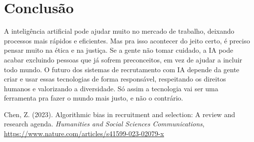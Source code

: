 \documentclass[english]{article}
\begin{document}
\section{Conclusão}
A inteligência artificial pode ajudar muito no mercado de trabalho, deixando processos mais rápidos e eficientes. Mas pra isso acontecer do jeito certo, é preciso pensar muito na ética e na justiça. Se a gente não tomar cuidado, a IA pode acabar excluindo pessoas que já sofrem preconceitos, em vez de ajudar a incluir todo mundo. O futuro dos sistemas de recrutamento com IA depende da gente criar e usar essas tecnologias de forma responsável, respeitando os direitos humanos e valorizando a diversidade. Só assim a tecnologia vai ser uma ferramenta pra fazer o mundo mais justo, e não o contrário.

\begin{thebibliography}{1}
 Chen, Z. (2023). Algorithmic bias in recruitment and selection: A review and research agenda. \textit{Humanities and Social Sciences Communications}, \href{https://www.nature.com/articles/s41599-023-02079-x}{https://www.nature.com/articles/s41599-023-02079-x}
\end{thebibliography}
\end{document}
